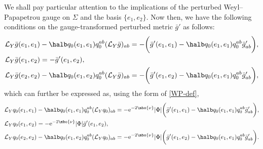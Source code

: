 We shall pay particular attention to the implications of the perturbed Weyl--Papapetrou gauge on $\Sigma$ and the basis $\{ e_1, e_2\}$. Now then, we have the following conditions on the gauge-transformed perturbed metric $\bar{g}'$ as follows:
\begin{align*}
&\mathcal{L}_Y \bar{g} (e_1, e_1) -\halb q_{0} (e_1, e_1) q^{ab}_0 (\mathcal{L}_{Y} \bar{g} ) _{ab}= - \biggl(\bar{g}' (e_1, e_1) - \halb q_0 (e_1, e_1) q^{ab}_0 \bar{g}'_{ab} \biggr) , \\
&\mathcal{L}_Y \bar{g} (e_1, e_2)= - \bar{g}' (e_1, e_2) , \\
&\mathcal{L}_Y \bar{g} (e_2, e_2) -\halb q_{0} (e_1, e_2) q^{ab}_0 (\mathcal{L}_{Y} \bar{g} ) _{ab}= - \biggl(\bar{g}' (e_1, e_2) - \halb q_0 (e_1, e_1) q^{ab}_0 \bar{g}'_{ab} \biggr),
\end{align*}
which can further be expressed as, using the form of \eqref{WP-def},
\begin{align*}
&\mathcal{L}_Y q_0 (e_1, e_1) -\halb q_{0} (e_1, e_1) q^{ab}_0 (\mathcal{L}_{Y} q_0 ) _{ab}= - {\rm e}^{-2 \mbo{\nu}}\vert \Phi \vert \biggl(\bar{g}' (e_1, e_1) - \halb q_0 (e_1, e_1) q^{ab}_0 \bar{g}'_{ab} \biggr) , \\
&\mathcal{L}_Y q_0 (e_1, e_2)= -{\rm e}^{-2\mbo{\nu}} \vert \Phi \vert \bar{g}' (e_1, e_2) , \\
&\mathcal{L}_Y q_0 (e_2, e_2) -\halb q_{0} (e_1, e_2) q^{ab}_0 (\mathcal{L}_{Y} q_0 ) _{ab}= - {\rm e}^{-2\mbo{\nu}}\vert \Phi \vert \biggl(\bar{g}' (e_1, e_2) - \halb q_0 (e_1, e_1) q^{ab}_0 \bar{g}'_{ab} \biggr).
\end{align*}

